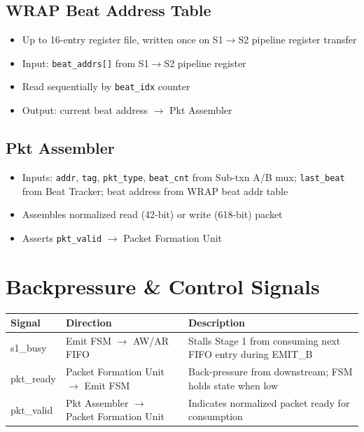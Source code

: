 \documentclass[11pt]{article}
\begin{document}
\subsection{WRAP Beat Address Table}
\begin{itemize}[noitemsep]
  \item Up to 16-entry register file, written once on S1$\rightarrow$S2 pipeline register transfer
  \item Input: \texttt{beat\_addrs[]} from S1$\rightarrow$S2 pipeline register
  \item Read sequentially by \texttt{beat\_idx} counter
  \item Output: current beat address $\rightarrow$ Pkt Assembler
\end{itemize}

\subsection{Pkt Assembler}
\begin{itemize}[noitemsep]
  \item Inputs: \texttt{addr}, \texttt{tag}, \texttt{pkt\_type}, \texttt{beat\_cnt} from Sub-txn A/B mux; \texttt{last\_beat} from Beat Tracker; beat address from WRAP beat addr table
  \item Assembles normalized read (42-bit) or write (618-bit) packet
  \item Asserts \texttt{pkt\_valid} $\rightarrow$ Packet Formation Unit
\end{itemize}

\section{Backpressure \& Control Signals}

\begin{center}
\begin{tabularx}{\textwidth}{>{\ttfamily}l >{\ttfamily}l X}
\toprule
\textbf{Signal} & \textbf{Direction} & \textbf{Description} \\
\midrule
s1\_busy   & Emit FSM $\rightarrow$ AW/AR FIFO     & Stalls Stage 1 from consuming next FIFO entry during EMIT\_B \\
pkt\_ready & Packet Formation Unit $\rightarrow$ Emit FSM & Back-pressure from downstream; FSM holds state when low \\
pkt\_valid & Pkt Assembler $\rightarrow$ Packet Formation Unit & Indicates normalized packet ready for consumption \\
\bottomrule
\end{tabularx}
\end{center}
\end{document}
